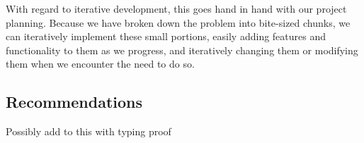 \documentclass[11pt]{article} %
\begin{document}
With regard to iterative development, this goes hand in hand with our
project planning. Because we have broken down the problem into
bite-sized chunks, we can iteratively implement these small portions,
easily adding features and functionality to them as we progress, and
iteratively changing them or modifying them when we encounter the need
to do so.

\subsection{Recommendations}


Possibly add to this with typing proof \cite{liuTypingProof}



\end{document}
